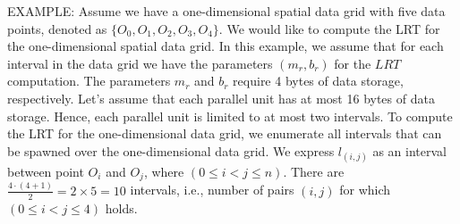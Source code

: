 \documentclass[AMA,LATO1COL]{WileyNJD-v2}
\begin{document}
EXAMPLE: Assume we have a one-dimensional spatial data grid with  five data points, denoted as $\{O_0,O_1,O_2,O_3,O_4\}$. We would like to compute the LRT for the one-dimensional spatial data grid. In this example, we assume that for each interval in the data grid we have the parameters $(m_r, b_r)$  for the $LRT$ computation. The parameters $m_r$ and $b_r$ require 4 bytes of data storage, respectively. Let's assume that each parallel unit has at most 16 bytes of data storage. Hence, each parallel unit is limited to at most two intervals. To compute the LRT for the one-dimensional data grid, we enumerate all intervals that can be spawned over the one-dimensional data grid. We express $l_{(i,j)}$ as an interval between point $O_i$ and $O_j$, where $ (0 \leq i <j \leq n)$.  There are ${\frac{4 \cdot (4+1)}{2}}=2\times 5=10$ intervals, i.e., number of pairs $(i,j)$ for which $(0 \leq i < j \leq 4)$ holds.
\end{document}
